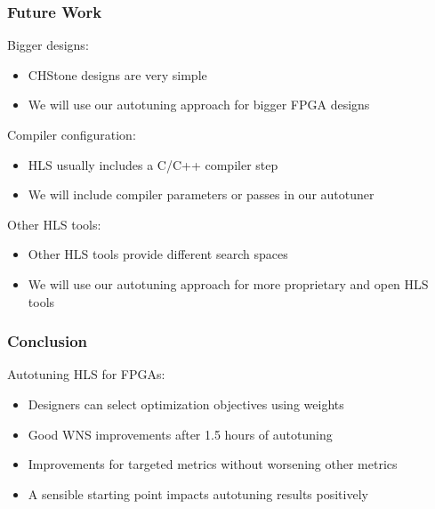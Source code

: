 \documentclass[10pt, compress, xcolor={table,xcdraw,usenames}, aspectratio=169]{beamer}
\begin{document}
\begin{frame}
    \frametitle{Future Work}
    \begin{block}{\alert{Bigger designs}:}
        \begin{itemize}
            \item CHStone \alert{designs are very simple}
            \item We will use our autotuning approach for \alert{bigger FPGA
                designs}
        \end{itemize}
    \end{block}

    \pause

    \begin{block}{\alert{Compiler configuration}:}
        \begin{itemize}
            \item HLS usually includes a C/C++ \alert{compiler step}
            \item We will include \alert{compiler parameters or passes} in our
                autotuner
        \end{itemize}
    \end{block}

    \pause

    \begin{block}{\alert{Other HLS tools}:}
        \begin{itemize}
            \item Other HLS tools provide \alert{different search spaces}
            \item We will use our autotuning approach for more
                \alert{proprietary and open HLS tools}
        \end{itemize}
    \end{block}
\end{frame}

\begin{frame}
    \frametitle{Conclusion}
    \begin{block}{Autotuning HLS for FPGAs:}
        \begin{itemize}
            \item Designers can \alert{select optimization objectives using
                weights}
            \item Good \alert{WNS improvements} after \alert{1.5 hours} of
                autotuning
            \item Improvements for targeted metrics \alert{without worsening
                other metrics}
            \item A \alert{sensible starting point} impacts autotuning results
                positively
        \end{itemize}
    \end{block}
\end{frame}

\maketitle
\end{document}
